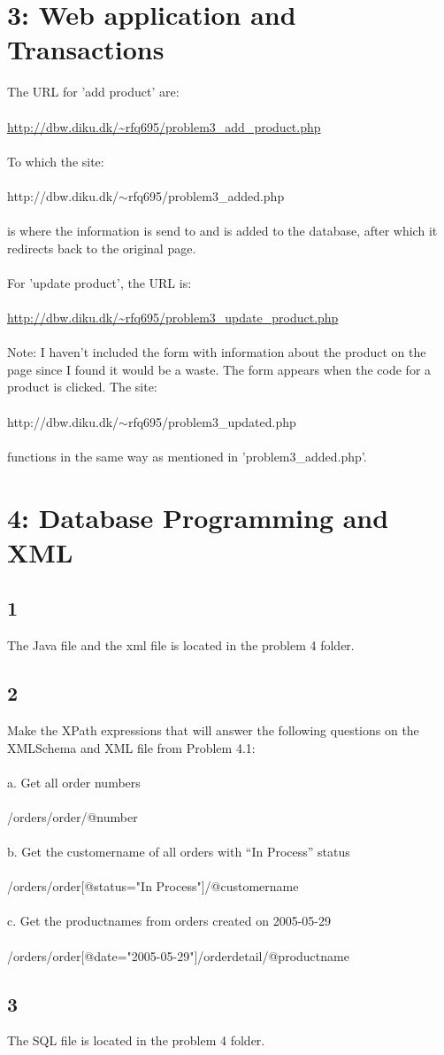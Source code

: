 \documentclass[12pt]{article}
\begin{document}
\section*{3: Web application and Transactions}
The URL for 'add product' are:\\
\\
\url{http://dbw.diku.dk/~rfq695/problem3\_add\_product.php}\\
\\
To which the site:\\
\\
http://dbw.diku.dk/$\sim$rfq695/problem3\_added.php\\
\\
is where the information is send to and is added to the database, after which it redirects back to the original page.\\
\\
For 'update product', the URL is:\\
\\
\url{http://dbw.diku.dk/~rfq695/problem3\_update\_product.php}\\
\\
Note: I haven't included the form with information about the product on the page since I found it would be a waste. The form appears when the code for a product is clicked.
The site:\\
\\	
http://dbw.diku.dk/$\sim$rfq695/problem3\_updated.php\\
\\
functions in the same way as mentioned in 'problem3\_added.php'.

\section*{4: Database Programming and XML}
\subsection*{1}
The Java file and the xml file is located in the problem 4 folder.

\subsection*{2}
Make the XPath expressions that will answer the following questions on the XMLSchema and XML file from Problem 4.1:\\
\\
a. Get all order numbers\\
\\
/orders/order/@number\\
\\
b. Get the customername of all orders with “In Process” status\\
\\
/orders/order[@status="In Process"]/@customername\\
\\
c. Get the productnames from orders created on 2005-05-29\\
\\
/orders/order[@date="2005-05-29"]/orderdetail/@productname

\subsection*{3}
The SQL file is located in the problem 4 folder.
\end{document}
